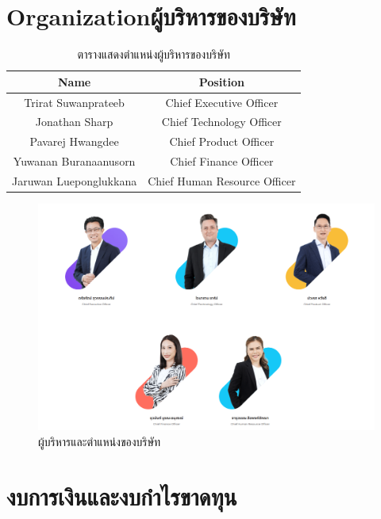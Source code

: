 \section{\ifenglish Organization\else ผู้บริหารของบริษัท\fi}
\begin{table}[ht]
    \centering
    \begin{tabular}{|c|c|}
        \hline
        \textbf{Name}          & \textbf{Position}            \\
        \hline
        Trirat Suwanprateeb    & Chief Executive Officer      \\
        Jonathan Sharp         & Chief Technology Officer     \\
        Pavarej Hwangdee       & Chief Product Officer        \\
        Yuwanan Buranaanusorn  & Chief Finance Officer        \\
        Jaruwan Lueponglukkana & Chief Human Resource Officer \\
        \hline
    \end{tabular}
    \caption{ตารางแสดงตำแหน่งผู้บริหารของบริษัท}
\end{table}
\begin{figure}[ht]
    \begin{center}
        \includegraphics[scale=0.35]{images/org.png}
    \end{center}
    \caption[ผู้บริหารและตำแหน่งของบริษัท]{ผู้บริหารและตำแหน่งของบริษัท}
\end{figure}

\clearpage

\section{งบการเงินและงบกำไรขาดทุน}
